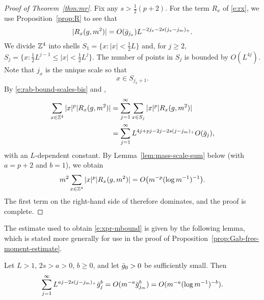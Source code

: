 \begin{proof}[Proof of Theorem~\ref{thm:mr}]
Fix any $s>\frac 12 (p+2)$.
For the term $R_x$ of \eqref{e:rx}, we use Proposition~\ref{prop:R}
to see that
\begin{equation}\label{e:rab-bound-scales-bis}
|R_x(g, m^2)|
=
O(\bar{g}_{j_x})
L^{-2j_x - 2s (j_x - j_m)_+}.
\end{equation}
We divide ${\mathbb Z}^4$ into shells $S_1 = \{x : |x| < \frac 12 L\}$ and, for $j \ge 2$,
$S_j = \{x : \frac 12 L^{j-1} \le |x| < \frac 12 L^{j}\}$.
The number of points in $S_j$ is bounded by $O(L^{4j})$.
Note that $j_x$ is the unique scale so that
\begin{equation}
   \label{e:Phi-def-jc}
    x \in S_{j_x +1}
   .
\end{equation}
By \eqref{e:rab-bound-scales-bis} and ,
\begin{equation} \label{e:xpr-shells}
\begin{aligned}
    \sum_{x\in{\mathbb Z}^4} |x|^p |R_{x}(g,m^2)|
    &= \sum_{j = 1}^\infty\sum_{x\in S_j}   |x|^p |R_{x}(g,m^2)|
    \\
    &= \sum_{j = 1}^\infty
    L^{4j + pj - 2j - 2s (j - j_m)_+} O(\bar{g}_{j})
    ,
\end{aligned}
\end{equation}
with an $L$-dependent constant.
By Lemma~\ref{lem:mass-scale-sum} below (with $a=p+2$ and $b=1$),
we obtain
\begin{equation}\label{e:xpr-mbound}
    m^2 \sum_{x\in{\mathbb Z}^4} |x|^p |R_{x}(g,m^2)|
    = O\big( m^{-p}(\log m^{-1})^{-1}\big).
\end{equation}
The first term on the right-hand side of  therefore dominates,
and the proof is complete.
\end{proof}

The estimate used to obtain \eqref{e:xpr-mbound}
is given by the following lemma,
which is stated more generally for use
in the proof of Proposition~\ref{prop:Gab-free-moment-estimate}.

\begin{lemma} \label{lem:mass-scale-sum}
Let $L>1$, $2s> a > 0$, $b \geq 0$, and let $\bar{g}_0>0$ be sufficiently small.
Then
\begin{equation} \label{e:gmsumbd}
\sum_{j=1}^\infty L^{aj - 2s (j - j_m)_+}
\bar{g}_j^b = O(m^{-a} \bar{g}_{j_m}^b) = O(m^{-a} (\log m^{-1})^{-b}).
\end{equation}
\end{lemma}

